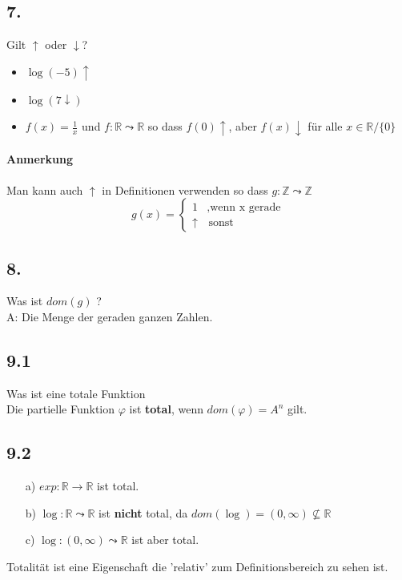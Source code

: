 \subsection*{7.}
    Gilt \(\uparrow\) oder \(\downarrow\)?
    \begin{itemize}
        \item \(\log(-5) \uparrow\)
        \item \(\log(7 \downarrow)\)
        \item \(f(x) = \frac{1}{x}\) und \(f: \mathbb{R} \leadsto \mathbb{R}\) so dass \(f(0) \uparrow\), aber \(f (x) \downarrow \) für alle \(x \in \mathbb{R} / \{0\}\)
    \end{itemize}
    \paragraph*{Anmerkung}
        Man kann auch \(\uparrow\) in Definitionen verwenden so dass \(g : \mathbb{Z}\leadsto \mathbb{Z}\)
        \[g(x) = 
        \begin{cases}
            1 &, \text{wenn x gerade}  \\
            \uparrow & \, \text{sonst}
        \end{cases}
        \]
    \subsection*{8.}
        Was ist \(dom(g)\) ?
        \vspace*{0.5cm}
        \\
        A: Die Menge der geraden ganzen Zahlen.

\subsection*{9.1}
    Was ist eine totale Funktion
    \vspace*{0.5cm}
    \\
    Die partielle Funktion \(\varphi\) ist \textbf{total}, wenn \(dom(\varphi) = A^n\) gilt.
\subsection*{9.2}
    \begin{itemize}
        \item [a)]\(exp : \mathbb{R} \to \mathbb{R}\) ist total.
        \item [b)]\(\log : \mathbb{R} \leadsto \mathbb{R}\) ist \textbf{nicht} total, da \(dom (\log) = (0,\infty) \not \subseteq \mathbb{R}\)
        \item [c)]\(\log : (0, \infty) \leadsto \mathbb{R}\) ist aber total. 
    \end{itemize}
    Totalität ist eine Eigenschaft die 'relativ' zum Definitionsbereich zu sehen ist.
